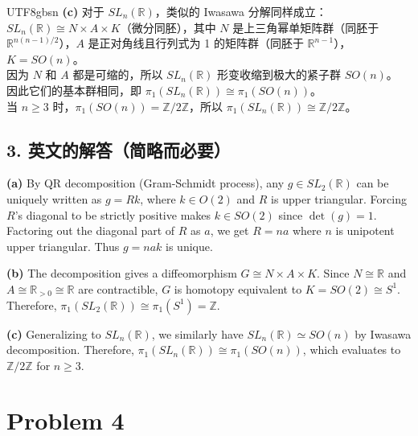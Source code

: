 \documentclass{article}
\begin{document}
\begin{CJK*}{UTF8}{gbsn}
\textbf{(c)} 对于 $SL_n(\mathbb{R})$，类似的 Iwasawa 分解同样成立：$SL_n(\mathbb{R}) \cong N \times A \times K$（微分同胚），其中 $N$ 是上三角幂单矩阵群（同胚于 $\mathbb{R}^{n(n-1)/2}$），$A$ 是正对角线且行列式为 1 的矩阵群（同胚于 $\mathbb{R}^{n-1}$），$K = SO(n)$。\\
因为 $N$ 和 $A$ 都是可缩的，所以 $SL_n(\mathbb{R})$ 形变收缩到极大的紧子群 $SO(n)$。\\
因此它们的基本群相同，即 $\pi_1(SL_n(\mathbb{R})) \cong \pi_1(SO(n))$。\\
当 $n \ge 3$ 时，$\pi_1(SO(n)) = \mathbb{Z}/2\mathbb{Z}$，所以 $\pi_1(SL_n(\mathbb{R})) \cong \mathbb{Z}/2\mathbb{Z}$。

\subsection*{3. 英文的解答（简略而必要）}
\textbf{(a)} By QR decomposition (Gram-Schmidt process), any $g \in SL_2(\mathbb{R})$ can be uniquely written as $g = R k$, where $k \in O(2)$ and $R$ is upper triangular. Forcing $R$'s diagonal to be strictly positive makes $k \in SO(2)$ since $\det(g)=1$. Factoring out the diagonal part of $R$ as $a$, we get $R = n a$ where $n$ is unipotent upper triangular. Thus $g = nak$ is unique.

\textbf{(b)} The decomposition gives a diffeomorphism $G \cong N \times A \times K$. Since $N \cong \mathbb{R}$ and $A \cong \mathbb{R}_{>0} \cong \mathbb{R}$ are contractible, $G$ is homotopy equivalent to $K = SO(2) \cong S^1$. Therefore, $\pi_1(SL_2(\mathbb{R})) \cong \pi_1(S^1) = \mathbb{Z}$.

\textbf{(c)} Generalizing to $SL_n(\mathbb{R})$, we similarly have $SL_n(\mathbb{R}) \simeq SO(n)$ by Iwasawa decomposition. Therefore, $\pi_1(SL_n(\mathbb{R})) \cong \pi_1(SO(n))$, which evaluates to $\mathbb{Z}/2\mathbb{Z}$ for $n \ge 3$.

\vspace{1em}

\section*{Problem 4}


\end{CJK*}
\end{document}

